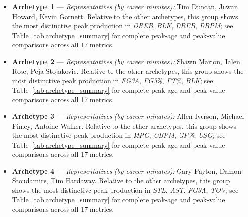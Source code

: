 \begin{itemize}
\item \textbf{Archetype 1} --- \emph{Representatives (by career minutes):} Tim Duncan, Juwan Howard, Kevin Garnett. Relative to the other archetypes, this group shows the most distinctive peak production in \textit{OREB}, \textit{BLK}, \textit{DREB}, \textit{DBPM}; see Table~\ref{tab:archetype_summary} for complete peak-age and peak-value comparisons across all 17 metrics.
\item \textbf{Archetype 2} --- \emph{Representatives (by career minutes):} Shawn Marion, Jalen Rose, Peja Stojakovic. Relative to the other archetypes, this group shows the most distinctive peak production in \textit{FG3A}, \textit{FG3\%}, \textit{FT\%}, \textit{BLK}; see Table~\ref{tab:archetype_summary} for complete peak-age and peak-value comparisons across all 17 metrics.
\item \textbf{Archetype 3} --- \emph{Representatives (by career minutes):} Allen Iverson, Michael Finley, Antoine Walker. Relative to the other archetypes, this group shows the most distinctive peak production in \textit{MPG}, \textit{OBPM}, \textit{GP\%}, \textit{USG}; see Table~\ref{tab:archetype_summary} for complete peak-age and peak-value comparisons across all 17 metrics.
\item \textbf{Archetype 4} --- \emph{Representatives (by career minutes):} Gary Payton, Damon Stoudamire, Tim Hardaway. Relative to the other archetypes, this group shows the most distinctive peak production in \textit{STL}, \textit{AST}, \textit{FG3A}, \textit{TOV}; see Table~\ref{tab:archetype_summary} for complete peak-age and peak-value comparisons across all 17 metrics.
\end{itemize}
